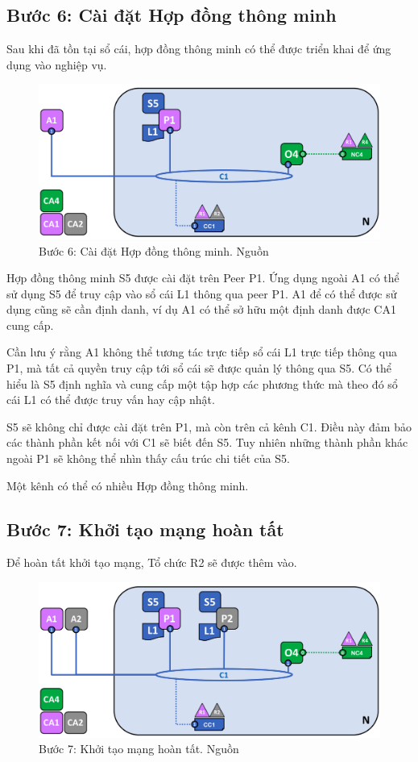 \documentclass[../DoAn.tex]{subfiles}
\begin{document}
\subsection{Bước 6: Cài đặt Hợp đồng thông minh}

Sau khi đã tồn tại sổ cái, hợp đồng thông minh có thể được triển khai để ứng
dụng vào nghiệp vụ.

\begin{figure}[h]
  \centering
  \includegraphics[width=0.7\linewidth]{Hinhve/network.diagram.6.png}
  \caption[Bước 6: Cài đặt Hợp đồng thông minh]{Bước 6: Cài đặt Hợp đồng thông minh. Nguồn \cite{fabric_architecture}}
  \label{fig:fabric_step_6}
\end{figure}

Hợp đồng thông minh S5 được cài đặt trên Peer P1. Ứng dụng ngoài A1 có thể sử
dụng S5 để truy cập vào sổ cái L1 thông qua peer P1. A1 để có thể được sử dụng
cũng sẽ cần định danh, ví dụ A1 có thể sở hữu một định danh được CA1 cung cấp.

Cần lưu ý rằng A1 không thể tương tác trực tiếp sổ cái L1 trực tiếp thông qua
P1, mà tất cả quyền truy cập tới sổ cái sẽ được quản lý thông qua S5. Có thể
hiểu là S5 định nghĩa và cung cấp một tập hợp các phương thức mà theo đó sổ cái
L1 có thể được truy vấn hay cập nhật.

S5 sẽ không chỉ được cài đặt trên P1, mà còn trên cả kênh C1. Điều này đảm bảo
các thành phần kết nối với C1 sẽ biết đến S5. Tuy nhiên những thành phần khác
ngoài P1 sẽ không thể nhìn thấy cấu trúc chi tiết của S5.

Một kênh có thể có nhiều Hợp đồng thông minh.

\subsection{Bước 7: Khởi tạo mạng hoàn tất}

Để hoàn tất khởi tạo mạng, Tổ chức R2 sẽ được thêm vào.

\begin{figure}[h]
  \centering
  \includegraphics[width=0.7\linewidth]{Hinhve/network.diagram.7.png}
  \caption[Bước 7: Khởi tạo mạng hoàn tất]{Bước 7: Khởi tạo mạng hoàn tất. Nguồn \cite{fabric_architecture}}
  \label{fig:fabric_step_7}
\end{figure}
\end{document}
